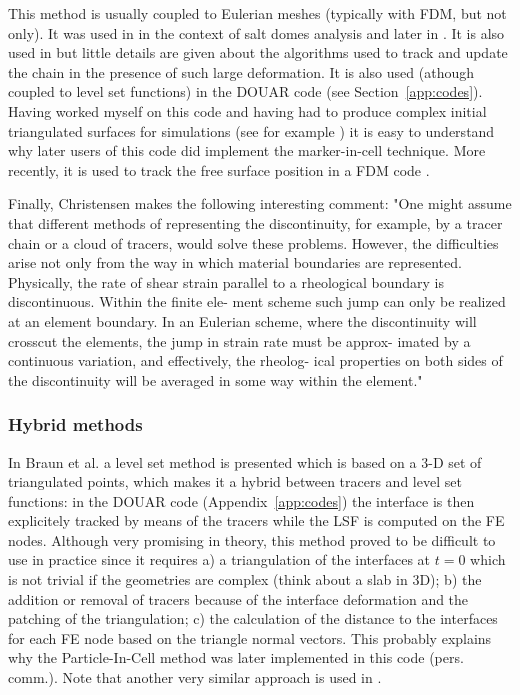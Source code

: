 This method is usually coupled to Eulerian meshes (typically with FDM, but not only). 
It was used in \cite{woid78} in the context of salt domes analysis and later in \cite{chri82,chyu84}.
It is also used in \cite{vaks97} but little details are given about the algorithms used
to track and update the chain in the presence of such large deformation.
It is also used (athough coupled to level set functions) in the DOUAR code\cite{brtf08} 
(see Section~\ref{app:codes}). Having worked myself on this code and having had to produce 
complex initial triangulated surfaces for simulations (see for example \cite{lobh10}) it is 
easy to understand why later users of this code did implement the marker-in-cell technique.
More recently, it is used to track the free surface position in a FDM code \cite{dumy16,chmd19}.

Finally, Christensen \cite{chri92} makes the following interesting comment:  
"One might assume that different methods 
of representing the discontinuity, for example, by a tracer 
chain \cite{chyu84} or a cloud of 
tracers, would solve these problems. However, the difficulties 
arise not only from the way in which material boundaries are 
represented. Physically, the rate of shear strain parallel to a 
rheological boundary is discontinuous. Within the finite ele-
ment scheme such jump can only be realized at an element 
boundary. In an Eulerian scheme, where the discontinuity will 
crosscut the elements, the jump in strain rate must be approx- 
imated by a continuous variation, and effectively, the rheolog-
ical properties on both sides of the discontinuity will be 
averaged in some way within the element."



\subsubsection{Hybrid methods}

In Braun et al. \cite{brtf08} a level set method is presented which is based on a 3-D set
of triangulated points, which makes it a hybrid between tracers and level set functions:
in the DOUAR code (Appendix~\ref{app:codes}) the interface is then explicitely tracked by means of the tracers while the LSF is computed 
on the FE nodes. Although very promising in theory, this method proved to be difficult to use in practice
since it requires a) a triangulation of the interfaces at $t=0$ which is not trivial if the geometries
are complex (think about a slab in 3D); b) the addition or removal of tracers because of the interface deformation
and the patching of the triangulation; c) the calculation of the distance to the interfaces for each 
FE node based on the triangle normal vectors. 
This probably explains why the Particle-In-Cell method was later implemented in this code (pers. comm.).
Note that another very similar approach is used in \cite{saev10}.



